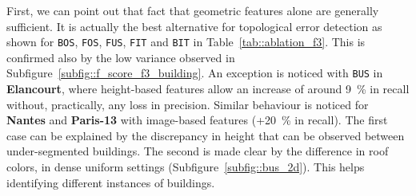             \begin{figure}[htpb]
                \centering
            \end{figure}

            First, we can point out that fact that geometric features alone are generally sufficient.
            It is actually the best alternative for topological error detection as shown for \texttt{BOS}, \texttt{FOS}, \texttt{FUS}, \texttt{FIT} and \texttt{BIT} in Table~\ref{tab::ablation_f3}.
            This is confirmed also by the low variance observed in Subfigure~\ref{subfig::f_score_f3_building}.
            An exception is noticed with \texttt{BUS} in \textbf{Elancourt}, where height-based features allow an increase of around \SI{9}{\percent} in recall without, practically, any loss in precision.
            Similar behaviour is noticed for \textbf{Nantes} and \textbf{Paris-13} with image-based features (+\SI{20}{\percent} in recall).
            The first case can be explained by the discrepancy in height that can be observed between under-segmented buildings.
            The second is made clear by the difference in roof colors, in dense uniform settings (Subfigure~\ref{subfig::bus_2d}).
            This helps identifying different instances of buildings.\\

